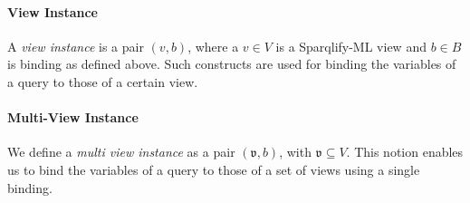\documentclass[a4paper,twoside,bibtotoc,abstracton,12pt,BCOR=15mm]{scrreprt}
\newcommand{\todo}[1]{\textbf{ToDo: \textit{#1}}}
\begin{document}







\paragraph{View Instance}
A \emph{view instance} is a pair $(v, b)$, where a $v \in V$ is a Sparqlify-ML view and $b \in B$ is binding as defined above.
Such constructs are used for binding the variables of a query to those of a certain view.

\paragraph{Multi-View Instance}
We define a \emph{multi view instance} as a pair $(\mathfrak{v}, b)$, with $\mathfrak{v} \subseteq V$. 
This notion enables us to bind the variables of a query to those of a set of views using a single binding.

\end{document}
